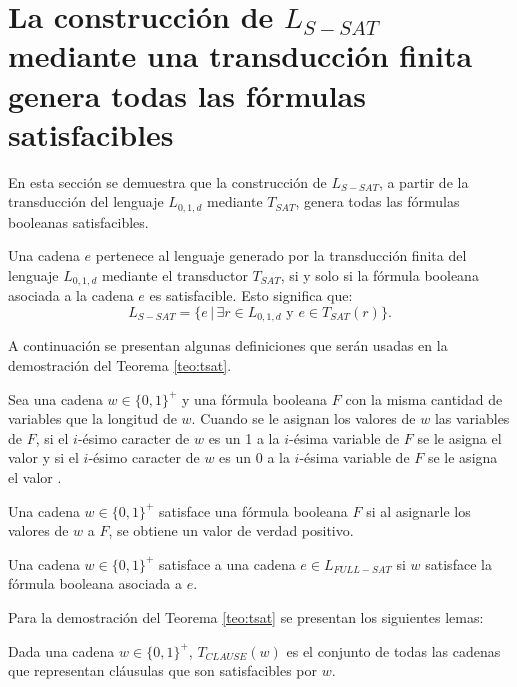 \section{La construcción de $L_{S-SAT}$ mediante una transducción finita
  genera todas las fórmulas satisfacibles}


En esta sección se demuestra que la construcción de $L_{S-SAT}$, a partir de la transducción del lenguaje $L_{0,1,d}$ mediante $T_{SAT}$, genera todas las fórmulas booleanas satisfacibles.

\begin{theorem}
    \label{teo:tsat}
    Una cadena $e$ pertenece al lenguaje generado por la transducción finita del lenguaje $L_{0,1,d}$ mediante el transductor $T_{SAT}$, si y solo si la fórmula booleana asociada a la cadena $e$ es satisfacible. Esto significa que:
    $$L_{S-SAT} = \{e\,|\,\exists r \in L_{0,1,d} \text{ y } e \in T_{SAT}(r) \}.$$
\end{theorem}

A continuación se presentan algunas definiciones que serán usadas en la demostración del Teorema \ref{teo:tsat}.


\begin{definition}
    Sea una cadena $w\in \{0,1\}^+$ y una fórmula booleana $F$ con la misma cantidad de variables que la longitud de 
    $w$. Cuando se le asignan los valores de $w$ las variables de $F$, si el $i$-ésimo caracter de $w$ es un 1 a la $i$-ésima variable de $F$ se le asigna
    el valor \true{} y si el $i$-ésimo caracter de $w$ es un 0 a la $i$-ésima variable de $F$ se le asigna
    el valor \false{}.
\end{definition}

\begin{definition}
    Una cadena  $w\in\{0,1\}^+$ satisface una fórmula booleana $F$ si al asignarle los valores de $w$ a $F$, se obtiene un valor de verdad positivo.
\end{definition}

\begin{definition}
    Una cadena $w\in\{0,1\}^+$ satisface a una cadena $e\in L_{FULL-SAT}$ si $w$ satisface la fórmula booleana asociada a $e$. 
\end{definition}

Para la demostración del Teorema \ref{teo:tsat} se presentan los siguientes lemas:

\begin{lemma}
    \label{lem:clause}
    Dada una cadena $w\in\{0,1\}^+$, $T_{CLAUSE}(w)$ es el conjunto de todas las cadenas que representan cláusulas que son satisfacibles por $w$.
\end{lemma}

